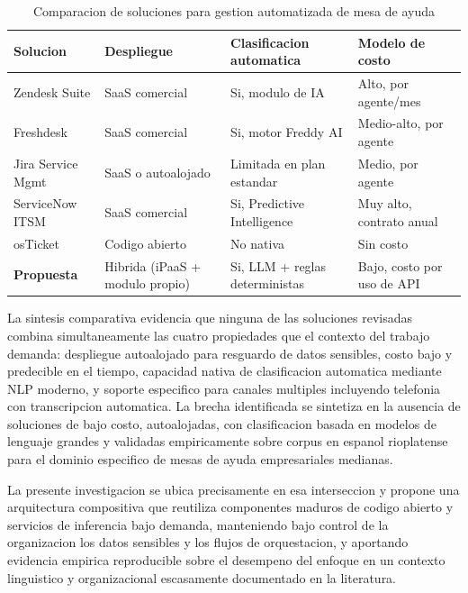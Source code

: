 \begin{table}[htbp]
\centering
\caption{Comparacion de soluciones para gestion automatizada de mesa de ayuda}
\label{tab:comparativa}
\begin{tabular}{@{}p{3.2cm} p{3.2cm} p{3.2cm} p{3.2cm}@{}}
\toprule
\textbf{Solucion} & \textbf{Despliegue} & \textbf{Clasificacion automatica} & \textbf{Modelo de costo} \\
\midrule
Zendesk Suite     & SaaS comercial      & Si, modulo de IA                & Alto, por agente/mes \\
Freshdesk         & SaaS comercial      & Si, motor Freddy AI             & Medio-alto, por agente \\
Jira Service Mgmt & SaaS o autoalojado  & Limitada en plan estandar       & Medio, por agente \\
ServiceNow ITSM   & SaaS comercial      & Si, Predictive Intelligence     & Muy alto, contrato anual \\
osTicket          & Codigo abierto      & No nativa                       & Sin costo \\
\addlinespace
\textbf{Propuesta} & Hibrida (iPaaS + modulo propio) & Si, LLM + reglas deterministas & Bajo, costo por uso de API \\
\bottomrule
\end{tabular}
\end{table}

La sintesis comparativa evidencia que ninguna de las soluciones revisadas combina simultaneamente las cuatro propiedades que el contexto del trabajo demanda: despliegue autoalojado para resguardo de datos sensibles, costo bajo y predecible en el tiempo, capacidad nativa de clasificacion automatica mediante NLP moderno, y soporte especifico para canales multiples incluyendo telefonia con transcripcion automatica. La brecha identificada se sintetiza en la ausencia de soluciones de bajo costo, autoalojadas, con clasificacion basada en modelos de lenguaje grandes y validadas empiricamente sobre corpus en espanol rioplatense para el dominio especifico de mesas de ayuda empresariales medianas.

La presente investigacion se ubica precisamente en esa interseccion y propone una arquitectura compositiva que reutiliza componentes maduros de codigo abierto y servicios de inferencia bajo demanda, manteniendo bajo control de la organizacion los datos sensibles y los flujos de orquestacion, y aportando evidencia empirica reproducible sobre el desempeno del enfoque en un contexto linguistico y organizacional escasamente documentado en la literatura.

\newpage
